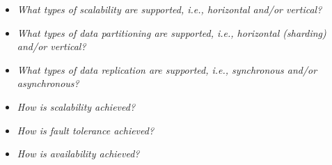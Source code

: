 
\begin{itemize}
\item \emph{What types of scalability are supported, i.e., horizontal and/or vertical?}
\item \emph{What types of data partitioning are supported, i.e., horizontal (sharding) and/or vertical?}
\item \emph{What types of data replication are supported, i.e., synchronous and/or asynchronous?}
\item \emph{How is scalability achieved?}
\item \emph{How is fault tolerance achieved?}
\item \emph{How is availability achieved?}
\end{itemize}